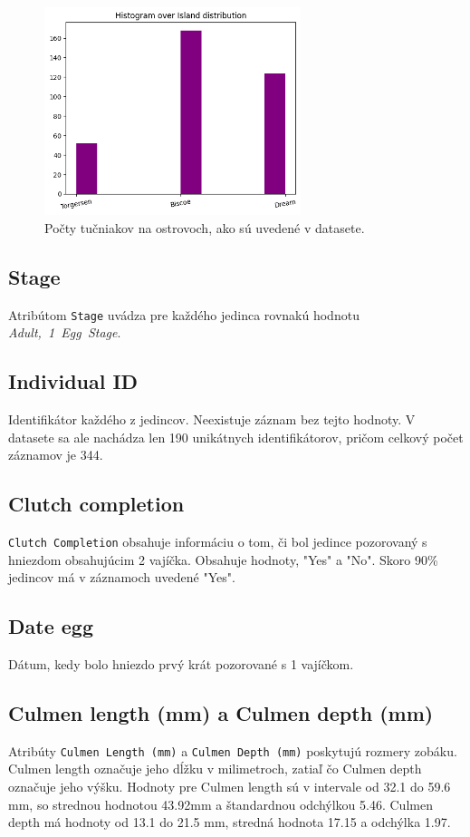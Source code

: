 \documentclass[10pt,xcolor=pdflatex,dvipsnames,table,oneside]{book}
\begin{document}
\begin{figure}[h]
  \includegraphics[width=7.5cm]{img/island.png}
  \centering
  \caption{Počty tučniakov na ostrovoch, ako sú uvedené v datasete.}
  \label{fig:counts}
\end{figure}



\subsection*{Stage}
Atribútom \texttt{Stage} uvádza pre každého jedinca rovnakú hodnotu \textit{Adult,~1~Egg~Stage}.


\subsection*{Individual ID}
Identifikátor každého z jedincov. Neexistuje záznam bez tejto hodnoty. V datasete sa ale nachádza len 190 unikátnych identifikátorov, pričom celkový počet záznamov je 344.


\subsection*{Clutch completion}
\texttt{Clutch Completion} obsahuje informáciu o tom, či bol jedince pozorovaný s hniezdom obsahujúcim 2 vajíčka. Obsahuje
hodnoty, "Yes" a "No". Skoro 90\% jedincov má v záznamoch uvedené "Yes".


\subsection*{Date egg}
Dátum, kedy bolo hniezdo prvý krát pozorované s 1 vajíčkom.


\subsection*{Culmen length (mm) a Culmen depth (mm)}
Atribúty \texttt{Culmen Length (mm)} a  \texttt{Culmen Depth (mm)} poskytujú rozmery zobáku. Culmen length označuje jeho dĺžku v milimetroch, zatiaľ čo Culmen depth označuje jeho výšku. Hodnoty pre Culmen length sú v intervale od 32.1 do 59.6 mm, so strednou hodnotou 43.92mm a štandardnou odchýlkou 5.46. Culmen depth má hodnoty od 13.1 do 21.5 mm, stredná hodnota 17.15 a odchýlka 1.97.
\end{document}
